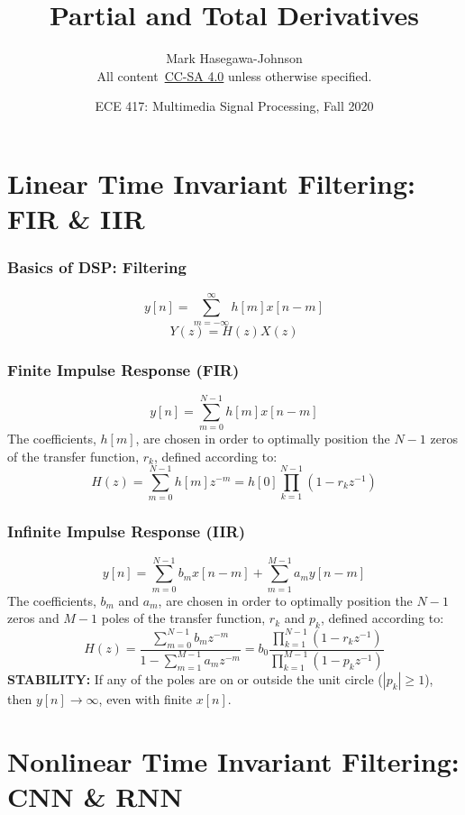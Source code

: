 \documentclass{beamer}
\title{Partial and Total Derivatives}
\author{Mark Hasegawa-Johnson\\All content~\href{https://creativecommons.org/licenses/by-sa/4.0/}{CC-SA 4.0} unless otherwise specified.}
\date{ECE 417: Multimedia Signal Processing, Fall 2020}
\begin{document}
\begin{frame}
  \maketitle
\end{frame}

\begin{frame}
  \tableofcontents
\end{frame}

\section[FIR/IIR]{Linear Time Invariant Filtering: FIR \& IIR}
\setcounter{subsection}{1}

\begin{frame}
  \frametitle{Basics of DSP: Filtering}
  \[
  y[n] = \sum_{m=-\infty}^\infty h[m] x[n-m]
  \]
  \[
  Y(z)=H(z)X(z)
  \]
\end{frame}

\begin{frame}
  \frametitle{Finite Impulse Response (FIR)}
  \[
  y[n] = \sum_{m=0}^{N-1}h[m]x[n-m]
  \]
  The coefficients, $h[m]$, are chosen in order to optimally position
  the $N-1$ zeros of the transfer function, $r_k$, defined according to:
  \[
  H(z)=\sum_{m=0}^{N-1}h[m] z^{-m}=h[0]\prod_{k=1}^{N-1}\left(1-r_kz^{-1}\right)
  \]
\end{frame}

\begin{frame}
  \frametitle{Infinite Impulse Response (IIR)}
  \[
  y[n] = \sum_{m=0}^{N-1}b_mx[n-m] + \sum_{m=1}^{M-1}a_m y[n-m]
  \]
  The coefficients, $b_m$ and $a_m$, are chosen in order to optimally
  position the $N-1$ zeros and $M-1$ poles of the transfer function,
  $r_k$ and $p_k$, defined according to:
  \[
  H(z)=\frac{\sum_{m=0}^{N-1}b_m z^{-m}}{1-\sum_{m=1}^{M-1}a_m z^{-m}}
  =b_0\frac{\prod_{k=1}^{N-1}\left(1-r_kz^{-1}\right)}{\prod_{k=1}^{M-1}\left(1-p_kz^{-1}\right)}
  \]
  {\bf STABILITY:} If any of the poles are on or outside the unit
  circle ($|p_k|\ge 1$), then $y[n]\rightarrow\infty$, even with
  finite $x[n]$.
\end{frame}

\section[CNN/RNN]{Nonlinear Time Invariant Filtering: CNN \& RNN}
\setcounter{subsection}{1}
\end{document}
